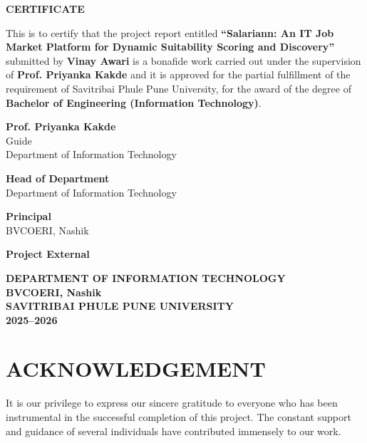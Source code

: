 \newpage
\begin{center}
    \textbf{\Large CERTIFICATE}
\end{center}
\vspace{1cm}
This is to certify that the project report entitled \textbf{``Salariann: An IT Job Market Platform for Dynamic Suitability Scoring and Discovery''} submitted by \textbf{Vinay Awari} is a bonafide work carried out under the supervision of \textbf{Prof. Priyanka Kakde} and it is approved for the partial fulfillment of the requirement of Savitribai Phule Pune University, for the award of the degree of \textbf{Bachelor of Engineering (Information Technology)}.

\vspace{3cm}

\noindent
\begin{minipage}[t]{0.45\textwidth}
\textbf{Prof. Priyanka Kakde} \\
Guide \\
Department of Information Technology
\end{minipage}
\hfill
\begin{minipage}[t]{0.45\textwidth}
\textbf{Head of Department} \\
Department of Information Technology
\end{minipage}

\vspace{2cm}

\noindent
\begin{minipage}[t]{0.45\textwidth}
\textbf{Principal} \\
BVCOERI, Nashik
\end{minipage}
\hfill
\begin{minipage}[t]{0.45\textwidth}
\textbf{Project External}
\end{minipage}

\vspace{2cm}
\begin{center}
    \textbf{DEPARTMENT OF INFORMATION TECHNOLOGY} \\
    \textbf{BVCOERI, Nashik} \\
    \textbf{SAVITRIBAI PHULE PUNE UNIVERSITY} \\
    \textbf{2025--2026}
\end{center}

\newpage
\chapter*{ACKNOWLEDGEMENT}
It is our privilege to express our sincere gratitude to everyone who has been instrumental in the successful completion of this project. The constant support and guidance of several individuals have contributed immensely to our work.

